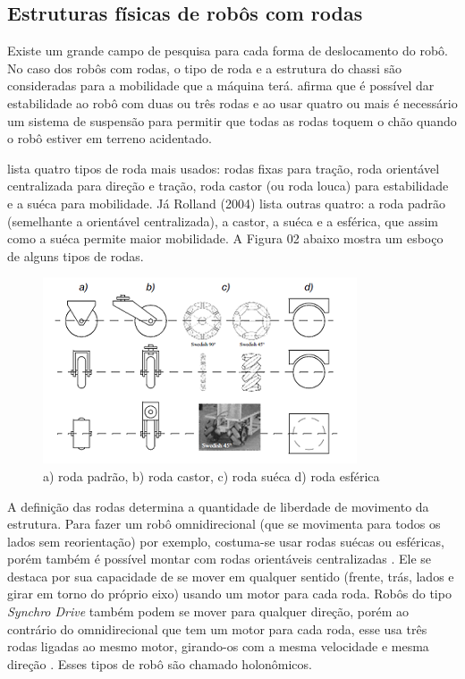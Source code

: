 \subsection{Estruturas físicas de robôs com rodas}

Existe um grande campo de pesquisa para cada forma de deslocamento do robô. No caso dos robôs com rodas, o tipo de roda e a estrutura do chassi são consideradas para a mobilidade que a máquina terá. \cite{Siegwart2004} afirma que é possível dar estabilidade ao robô com duas ou três rodas e ao usar quatro ou mais é necessário um sistema de suspensão para permitir que todas as rodas toquem o chão quando o robô estiver em terreno acidentado.

\cite{Secchi2008} lista quatro tipos de roda mais usados: rodas fixas para tração, roda orientável centralizada para direção e tração, roda castor (ou roda louca) para estabilidade e a suéca para mobilidade. Já Rolland (2004) lista outras quatro: a roda padrão (semelhante a orientável centralizada), a castor, a suéca e a esférica, que assim como a suéca permite maior mobilidade. A Figura 02 abaixo mostra um esboço de alguns tipos de rodas.

\begin{figure}[h]
	\centering
	\label{fig02}
		\includegraphics[keepaspectratio=true,scale=1]{figuras/1rodas.png}
	\caption{a) roda padrão, b) roda castor, c) roda suéca d) roda esférica \cite{Siegwart2004}}
\end{figure}

A definição das rodas determina a quantidade de liberdade de movimento da estrutura. Para fazer um robô omnidirecional (que se movimenta para todos os lados sem reorientação) por exemplo, costuma-se usar rodas suécas ou esféricas, porém também é possível montar com rodas orientáveis centralizadas \cite{Secchi2008}. Ele se destaca por sua capacidade de se mover em qualquer sentido (frente, trás, lados e girar em torno do próprio eixo) usando um motor para cada roda. Robôs do tipo \textit{Synchro Drive} também podem se mover para qualquer direção, porém ao contrário do omnidirecional que tem um motor para cada roda, esse usa três rodas ligadas ao mesmo motor, girando-os com a mesma velocidade e mesma direção \cite{Borenstein1996}. Esses tipos de robô são chamado holonômicos.

